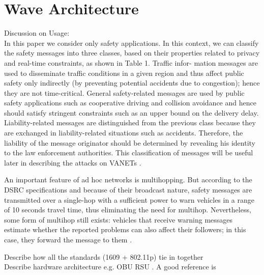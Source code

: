 \documentclass[conference]{IEEEtran}
\begin{document}
\section{Wave Architecture}

Discussion on Usage:\\
In this paper we consider only safety applications. In this context, we can classify the safety messages into three classes, based on their properties related to privacy and real-time constraints, as shown in Table 1. Traffic infor-
mation messages are used to disseminate traffic conditions in a given region and thus affect public safety only indirectly (by preventing potential accidents due to congestion); hence they are not time-critical. General safety-related messages are used by public safety applications such as cooperative driving and collision avoidance and
hence should satisfy stringent constraints such as an upper bound on the delivery delay. Liability-related messages are distinguished from the previous class because they are exchanged in liability-related situations such as accidents. Therefore, the liability of the message originator should be determined by revealing his identity to
the law enforcement authorities. This classification of messages will be useful later in describing the attacks on VANETs \cite{raya2007securing}.

An important feature of ad hoc networks is multihopping. But according to the DSRC specifications and because of their broadcast nature, safety messages are transmitted over a single-hop with a sufficient power to warn vehicles in a range of 10 seconds travel time, thus eliminating the need for multihop. Nevertheless, some form of multihop still exists: vehicles that receive warning messages estimate whether the reported problems can also affect their followers; in this case, they forward the message to them \cite{raya2007securing}.

Describe how all the standards (1609 + 802.11p) tie in together\\

Describe hardware architecture e.g. OBU RSU . A good reference is \cite{laurendeau2006threats}\\
\end{document}
